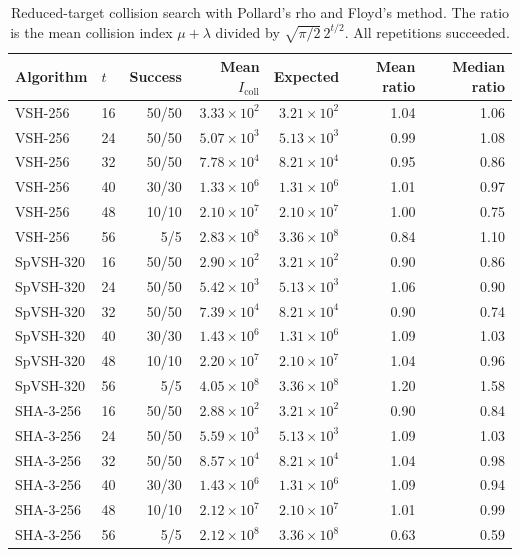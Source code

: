 \begin{table}[ht]
\caption{Reduced-target collision search with Pollard's rho and Floyd's method. The ratio is the mean collision index \(\mu+\lambda\) divided by \(\sqrt{\pi/2}\,2^{t/2}\). All repetitions succeeded.}
\label{tab:collision_run01}
\centering
\small
\begin{tabular}{@{}llrrrrr@{}}
\toprule
Algorithm & \(t\) & Success & Mean \(I_{\mathrm{coll}}\) & Expected & Mean ratio & Median ratio \\
\midrule
VSH-256 & 16 & 50/50 & \(3.33\times 10^{2}\) & \(3.21\times 10^{2}\) & 1.04 & 1.06 \\
VSH-256 & 24 & 50/50 & \(5.07\times 10^{3}\) & \(5.13\times 10^{3}\) & 0.99 & 1.08 \\
VSH-256 & 32 & 50/50 & \(7.78\times 10^{4}\) & \(8.21\times 10^{4}\) & 0.95 & 0.86 \\
VSH-256 & 40 & 30/30 & \(1.33\times 10^{6}\) & \(1.31\times 10^{6}\) & 1.01 & 0.97 \\
VSH-256 & 48 & 10/10 & \(2.10\times 10^{7}\) & \(2.10\times 10^{7}\) & 1.00 & 0.75 \\
VSH-256 & 56 & 5/5 & \(2.83\times 10^{8}\) & \(3.36\times 10^{8}\) & 0.84 & 1.10 \\
\midrule
SpVSH-320 & 16 & 50/50 & \(2.90\times 10^{2}\) & \(3.21\times 10^{2}\) & 0.90 & 0.86 \\
SpVSH-320 & 24 & 50/50 & \(5.42\times 10^{3}\) & \(5.13\times 10^{3}\) & 1.06 & 0.90 \\
SpVSH-320 & 32 & 50/50 & \(7.39\times 10^{4}\) & \(8.21\times 10^{4}\) & 0.90 & 0.74 \\
SpVSH-320 & 40 & 30/30 & \(1.43\times 10^{6}\) & \(1.31\times 10^{6}\) & 1.09 & 1.03 \\
SpVSH-320 & 48 & 10/10 & \(2.20\times 10^{7}\) & \(2.10\times 10^{7}\) & 1.04 & 0.96 \\
SpVSH-320 & 56 & 5/5 & \(4.05\times 10^{8}\) & \(3.36\times 10^{8}\) & 1.20 & 1.58 \\
\midrule
SHA-3-256 & 16 & 50/50 & \(2.88\times 10^{2}\) & \(3.21\times 10^{2}\) & 0.90 & 0.84 \\
SHA-3-256 & 24 & 50/50 & \(5.59\times 10^{3}\) & \(5.13\times 10^{3}\) & 1.09 & 1.03 \\
SHA-3-256 & 32 & 50/50 & \(8.57\times 10^{4}\) & \(8.21\times 10^{4}\) & 1.04 & 0.98 \\
SHA-3-256 & 40 & 30/30 & \(1.43\times 10^{6}\) & \(1.31\times 10^{6}\) & 1.09 & 0.94 \\
SHA-3-256 & 48 & 10/10 & \(2.12\times 10^{7}\) & \(2.10\times 10^{7}\) & 1.01 & 0.99 \\
SHA-3-256 & 56 & 5/5 & \(2.12\times 10^{8}\) & \(3.36\times 10^{8}\) & 0.63 & 0.59 \\
\bottomrule
\end{tabular}
\end{table}
